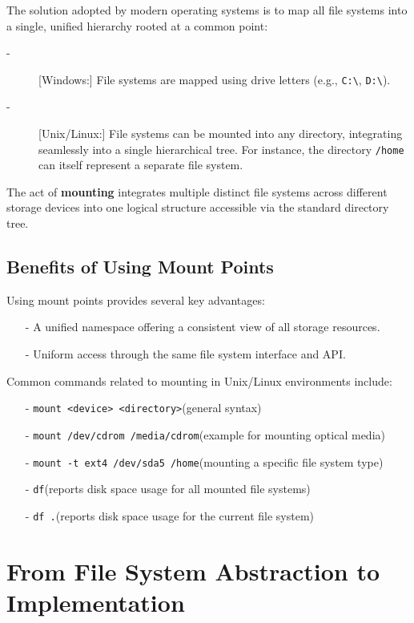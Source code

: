 The solution adopted by modern operating systems is to map all file systems into a single, unified hierarchy rooted at a common point:
\begin{description}
    \item[-][Windows:] File systems are mapped using drive letters (e.g., \texttt{C:\textbackslash}, \texttt{D:\textbackslash}).
    \item[-][Unix/Linux:] File systems can be mounted into any directory, integrating seamlessly into a single hierarchical tree. For instance, the directory \texttt{/home} can itself represent a separate file system.
\end{description}

The act of \textbf{mounting} integrates multiple distinct file systems across different storage devices into one logical structure accessible via the standard directory tree.
\newpage
\subsection{Benefits of Using Mount Points}
Using mount points provides several key advantages:
\begin{itemize}[itemsep=2pt, topsep=1pt]
    \item[-] A unified namespace offering a consistent view of all storage resources.
    \item[-] Uniform access through the same file system interface and API.
\end{itemize}

Common commands related to mounting in Unix/Linux environments include:
\begin{itemize}
    \item[-] \texttt{mount <device> <directory>}\quad (general syntax)
    \item[-] \texttt{mount /dev/cdrom /media/cdrom}\quad (example for mounting optical media)
    \item[-] \texttt{mount -t ext4 /dev/sda5 /home}\quad (mounting a specific file system type)
    \item[-] \texttt{df}\quad (reports disk space usage for all mounted file systems)
    \item[-] \texttt{df .}\quad (reports disk space usage for the current file system)
\end{itemize}

\section{From File System Abstraction to Implementation}

